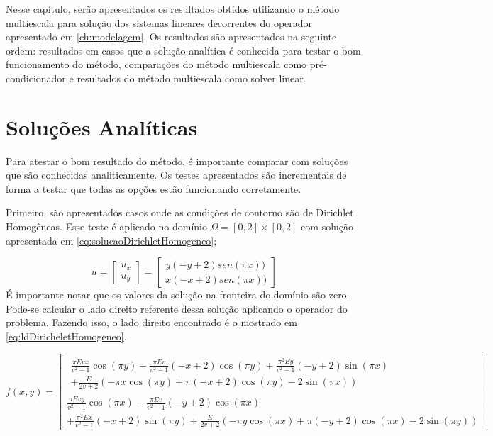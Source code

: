 Nesse capítulo, serão apresentados os resultados obtidos utilizando o método multiescala para solução dos sistemas lineares decorrentes do operador apresentado em \ref{ch:modelagem}. Os resultados são apresentados na seguinte ordem: resultados em casos que a solução analítica é conhecida para testar o bom funcionamento do método, comparações do método multiescala como pré-condicionador e resultados do método multiescala como solver linear.


\section{Soluções Analíticas}

Para atestar o bom resultado do método, é importante comparar com soluções que são conhecidas analiticamente. Os testes apresentados são incrementais de forma a testar que todas as opções estão funcionando corretamente.

Primeiro, são apresentados casos onde as condições de contorno são de Dirichlet Homogêneas. Esse teste é aplicado no domínio $ \Omega = [0, 2] \times [0, 2]$ com solução apresentada em \ref{eq:solucaoDirichletHomogeneo};

\begin{equation}\label{eq:solucaoDirichletHomogeneo}
u = 
\begin{bmatrix}
u_x
\\ 
u_y
\end{bmatrix}
=
\begin{bmatrix}
y(-y+2)sen(\pi x))
\\ 
x(-x+2)sen(\pi x))
\end{bmatrix}
\end{equation}É importante notar que os valores da solução na fronteira do domínio são zero. Pode-se calcular o lado direito referente dessa solução aplicando o operador do problema. Fazendo isso, o lado direito encontrado é o mostrado em \ref{eq:ldDiricheletHomogeneo}.

\begin{equation}\label{eq:ldDiricheletHomogeneo}
f(x, y) = 
\left[\begin{matrix}
\begin{split}
\frac{\pi E v x}{v^{2} - 1} \cos{\left (\pi y \right )} - \frac{\pi E v}{v^{2} - 1} \left(- x + 2\right) \cos{\left (\pi y \right )} + \frac{\pi^{2} E y}{v^{2} - 1} \left(- y + 2\right) \sin{\left (\pi x \right )} 
\\
+
\frac{E}{2 v + 2} \left(- \pi x \cos{\left (\pi y \right )} + \pi \left(- x + 2\right) \cos{\left (\pi y \right )} - 2 \sin{\left (\pi x \right )}\right)
 \end{split}
\\

\frac{\pi E v y}{v^{2} - 1} \cos{\left (\pi x \right )} - \frac{\pi E v}{v^{2} - 1} \left(- y + 2\right) \cos{\left (\pi x \right )} 
\\
+ \frac{\pi^{2} E x}{v^{2} - 1} \left(- x + 2\right) \sin{\left (\pi y \right )} + \frac{E}{2 v + 2} \left(- \pi y \cos{\left (\pi x \right )} + \pi \left(- y + 2\right) \cos{\left (\pi x \right )} - 2 \sin{\left (\pi y \right )}\right)\end{matrix}\right]
\end{equation}


